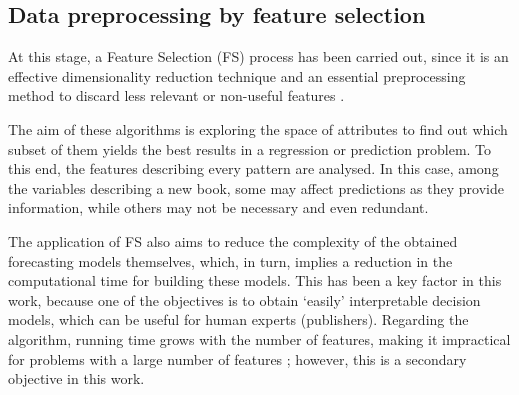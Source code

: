 \documentclass[a4paper,10pt,twocolumn,preprint,3p]{elsarticle}
\begin{document}
\subsection{Data preprocessing by feature selection}
\label{subsec:data_preproces}

At this stage, a Feature Selection (FS) process has been carried out, 
since it is an effective dimensionality reduction technique and an essential 
preprocessing method to discard less relevant or non-useful features 
\cite{Krishnapuram2004,Chen2011_FS_PTS}.

The aim of these algorithms is exploring the space of attributes to find out 
which subset of them yields the best results in a regression or prediction 
problem. To this end, the features describing every pattern are analysed. 
In this case, among the variables describing a new book, some may affect 
predictions as they provide information, while others may not be necessary 
and even redundant.

The application of FS also aims to reduce the complexity of the obtained 
forecasting models themselves, which, in turn, implies a reduction in the 
computational time for building these models. This has been a key 
factor in this work, because one of the objectives is to obtain `easily' 
interpretable decision models, which can be useful for human experts (publishers).
Regarding the algorithm, running time grows with the number of
features, making it impractical for problems with a large number of features 
\cite{Selvakuberan2008}; however, this is a secondary objective in this work.



\end{document}
